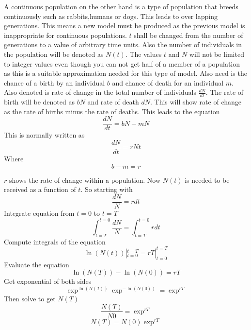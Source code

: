 \documentclass[final]{cmpreport}
\begin{document}
	A continuous population on the other hand is a type of population that breeds continuously such as rabbits,humans or dogs. This leads to over lapping generations. This means a new model must be produced as the previous model is inappropriate for continuous populations. $t$ shall be changed from the number of generations to a value of arbitrary time units. Also the number of individuals in the population will be denoted as $N(t)$. The values $t$ and $N$ will not be limited to integer values even though you can not get half of a member of a population as this is a suitable approximation needed for this type of model. Also need is the chance of a birth by an individual $b$ and chance of death for an individual $m$. Also denoted is rate of change in the total number of individuals $\frac{dN}{dt}$. The rate of birth will be denoted as $bN$ and rate of death $dN$. This will show rate of change as the rate of births minus the rate of deaths. This leads to the equation 
	\begin{equation}
		 \frac{dN}{dt} = bN-mN
	\end{equation}
	This is normally written as  
	\begin{equation}	
		\frac{dN}{dt} =rNt
	\end{equation}
	Where 
	\begin{equation}
		b-m = r 
	\end{equation}
	
	$r$ shows the rate of change within a population. Now $N(t)$ is needed to be received as a function of $t$. So starting with
	\begin{equation}
	\frac{dN}{N} =rdt
	\end{equation}
	Integrate equation from $t=0$ to $t=T$
	\begin{equation}
	 	\int_{t=T}^{t=0}\frac{dN}{N} =\int_{t=T}^{t=0}rdt
	\end{equation}
	Compute integrals of the equation
	\begin{equation}
	 	\ln(N(t))|^{t=T}_{t=0} = rT|^{t=T}_{t=0} 
	\end{equation}
	Evaluate the equation
	\begin{equation}
	 	\ln(N(T)) - \ln(N(0)) = rT 
	\end{equation}
	Get exponential of both sides
	\begin{equation}
	 	\exp^{\ln(N(T))}\exp^ {- \ln(N(0))} = \exp^{rT} 
	\end{equation}
	Then solve to get $N(T)$
	\begin{equation}
	 \frac{N(T)}{N0}= \exp^{rT} 
	\end{equation}
	\begin{equation}
	 N(T)= N(0) \exp^{rT} 
	\end{equation}
	
\end{document}
